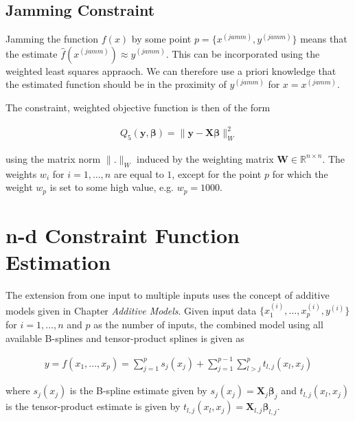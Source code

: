 \documentclass[10pt,a4paper]{article}
\begin{document}
	\subsection{Jamming Constraint}
	
	Jamming the function $f(x)$ by some point $p = \{x^{(jamm)}, y^{(jamm)}\}$ means that the estimate $\hat f(x^{(jamm)}) \approx y^{(jamm)}$. This can be incorporated using the weighted least squares appraoch. \cite{strutz2016data} We can therefore use a priori knowledge that the estimated function should be in the proximity of $y^{(jamm)}$ for $x = x^{(jamm)}$. 
	
	The constraint, weighted objective function is then of the form
	
	\begin{align}\label{eq:OF_5}
		Q_5(\boldsymbol{y}, \boldsymbol{\beta}) = \lVert \boldsymbol{y} - \boldsymbol{X}\boldsymbol{\beta} \rVert^2_W
	\end{align}
	
	using the matrix norm $\lVert .\rVert_W$ induced by the weighting matrix $\boldsymbol{W} \in \mathbb{R}^{n \times n}$. The weights $w_i$ for $i=1, \dots, n$ are equal to $1$, except for the point $p$ for which the weight $w_p$ is set to some high value, e.g. $w_p = 1000$.
	
	\section{n-d Constraint Function Estimation}
	
	The extension from one input to multiple inputs uses the concept of additive models given in Chapter \emph{Additive Models}. Given input data $\{ x_1^{(i)}, \dots, x_p^{(i)}, y^{(i)}\}$ for $i = 1, \dots, n$ and $p$ as the number of inputs, the combined model using all available B-splines and tensor-product splines is given as
	
	\begin{align} \label{eq:tps_all}
		y = f(x_1,..., x_p) = \sum_{j=1}^p s_j(x_j) + \sum_{j=1}^{p-1} \sum_{l>j}^p t_{l,j}(x_l, x_j)
	\end{align}
	
	where $s_j(x_j)$ is the B-spline estimate given by $s_j(x_j) = \boldsymbol{X}_j \boldsymbol{\beta}_j$ and $t_{l, j}(x_l,x_j)$ is the tensor-product estimate is given by $t_{l, j}(x_l,x_j) = \boldsymbol{X}_{l,j} \boldsymbol{\beta}_{l,j}$. 
	
\end{document}
